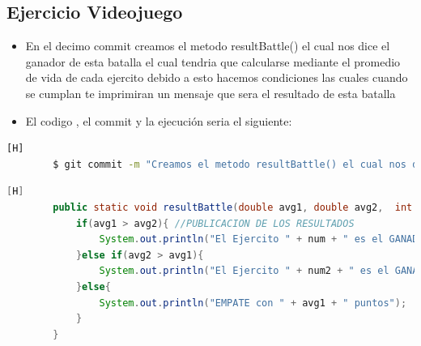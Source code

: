 \documentclass{article}
\begin{document}
	\subsection{Ejercicio Videojuego}
	\begin{itemize}	
		\item En el decimo commit creamos el metodo resultBattle() el cual nos dice el ganador de esta batalla el cual tendria que calcularse mediante el promedio de vida de cada ejercito debido a esto hacemos condiciones las cuales cuando se cumplan te imprimiran un mensaje que sera el resultado de esta batalla
		\item El codigo , el commit y la ejecución seria el siguiente:
	\end{itemize}	
	\begin{lstlisting}[language=bash,caption={Commit}][H]
		$ git commit -m "Creamos el metodo resultBattle() el cual nos dice el ganador de esta batalla el cual tendria que calcularse mediante el promedio de vida de cada ejercito debido a esto hacemos condiciones las cuales cuando se cumplan te imprimiran un mensaje que sera el resultado de esta batalla"
	\end{lstlisting}	
	\begin{lstlisting}[language=java,caption={Las lineas de codigos del metodo creado:}][H]
		public static void resultBattle(double avg1, double avg2,  int num, int num2){ //METODO CREADO PARA PODER SABER EL RESULTADO DE ESTA BATALLA ENTRE ESTOS 2 EJERCITOS
			if(avg1 > avg2){ //PUBLICACION DE LOS RESULTADOS
				System.out.println("El Ejercito " + num + " es el GANADOR con " + avg1+ " puntos");
			}else if(avg2 > avg1){
				System.out.println("El Ejercito " + num2 + " es el GANADOR con " + avg2 + " puntos");
			}else{
				System.out.println("EMPATE con " + avg1 + " puntos");
			}
		}
		
	\end{lstlisting}
\end{document}
